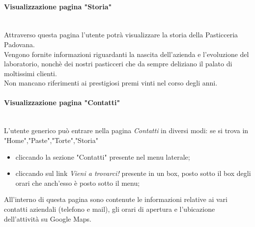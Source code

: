 \paragraph{Visualizzazione pagina "Storia"}\mbox{}\\
\label{par:VisStoria}
Attraverso questa pagina l'utente potrà visualizzare la storia della Pasticceria Padovana.\\
Vengono fornite informazioni riguardanti la nascita dell'azienda e l'evoluzione del laboratorio, nonchè dei nostri pasticceri che da sempre deliziano il palato di moltissimi clienti.\\
Non mancano riferimenti ai prestigiosi premi vinti nel corso degli anni.

\paragraph{Visualizzazione pagina "Contatti"}\mbox{}\\
\label{par:VisContatti}
L'utente generico può entrare nella pagina \emph{Contatti} in diversi modi: se si trova in "Home","Paste","Torte","Storia"
\begin{itemize}
	\item cliccando la sezione "Contatti" presente nel menu laterale; 
	\item cliccando sul link \emph{Vieni a trovarci!} presente in un box, posto sotto il box degli orari che anch'esso è posto sotto il menu;
\end{itemize}
All'interno di questa pagina sono contenute le informazioni relative ai vari contatti aziendali (telefono e mail),
gli orari di apertura e l'ubicazione dell'attività su Google Maps.

